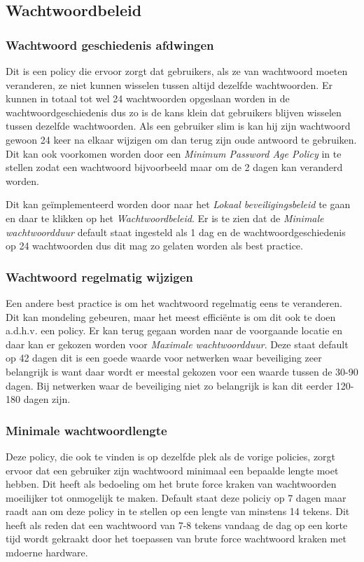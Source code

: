 \documentclass[pdftex,a4paper,12pt]{report}
\begin{document}
\subsection{Wachtwoordbeleid}
\subsubsection{Wachtwoord geschiedenis afdwingen}
Dit is een policy die ervoor zorgt dat gebruikers, als ze van wachtwoord moeten veranderen, ze niet kunnen wisselen tussen altijd dezelfde wachtwoorden. Er kunnen in totaal tot wel 24 wachtwoorden opgeslaan worden in de wachtwoordgeschiedenis dus zo is de kans klein dat gebruikers blijven wisselen tussen dezelfde wachtwoorden. Als een gebruiker slim is kan hij zijn wachtwoord gewoon 24 keer na elkaar wijzigen om dan terug zijn oude antwoord te gebruiken. Dit kan ook voorkomen worden door een \textit{Minimum Password Age Policy} in te stellen zodat een wachtwoord bijvoorbeeld maar om de 2 dagen kan veranderd worden. \citep{Stanek2009} \newline

Dit kan geïmplementeerd worden door naar het \textit{Lokaal beveiligingsbeleid} te gaan en daar te klikken op het \textit{Wachtwoordbeleid}. Er is te zien dat de \textit{Minimale wachtwoordduur} default staat ingesteld als 1 dag en de wachtwoordgeschiedenis op 24 wachtwoorden dus dit mag zo gelaten worden als best practice.

\subsubsection{Wachtwoord regelmatig wijzigen}
Een andere best practice is om het wachtwoord regelmatig eens te veranderen. Dit kan mondeling gebeuren, maar het meest efficiënte is om dit ook te doen a.d.h.v. een policy. Er kan terug gegaan worden naar de voorgaande locatie en daar kan er gekozen worden voor \textit{Maximale wachtwoordduur}. Deze staat default op 42 dagen dit is een goede waarde voor netwerken waar beveiliging zeer belangrijk is want daar wordt er meestal gekozen voor een waarde tussen de 30-90 dagen. Bij netwerken waar de beveiliging niet zo belangrijk is kan dit eerder 120-180 dagen zijn. \citep{Stanek2009}

\subsubsection{Minimale wachtwoordlengte}
Deze policy, die ook te vinden is op dezelfde plek als de vorige policies, zorgt ervoor dat een gebruiker zijn wachtwoord minimaal een bepaalde lengte moet hebben. Dit heeft als bedoeling om het brute force kraken van wachtwoorden moeilijker tot onmogelijk te maken. Default staat deze policiy op 7 dagen maar \cite{Stanek2009} raadt aan om deze policy in te stellen op een lengte van minstens 14 tekens. Dit heeft als reden dat een wachtwoord van 7-8 tekens vandaag de dag op een korte tijd wordt gekraakt door het toepassen van brute force wachtwoord kraken met mdoerne hardware.
\end{document}
